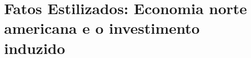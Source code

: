 \chapter{Fatos Estilizados: Economia norte americana e o investimento induzido}

\textcite{serrano_trabajadores_2008}